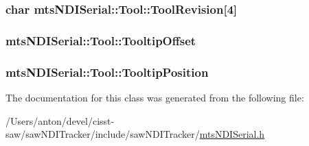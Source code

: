 \subsubsection[{Tool\+Revision}]{\setlength{\rightskip}{0pt plus 5cm}char mts\+N\+D\+I\+Serial\+::\+Tool\+::\+Tool\+Revision\mbox{[}4\mbox{]}}\label{classmts_n_d_i_serial_1_1_tool_aadd9c102dca4f53e5ea50188ddebc9e0}
\hypertarget{classmts_n_d_i_serial_1_1_tool_aa8acfe8b5a76a1fc7816233d6f853049}{}
\subsubsection[{Tooltip\+Offset}]{ mts\+N\+D\+I\+Serial\+::\+Tool\+::\+Tooltip\+Offset}\label{classmts_n_d_i_serial_1_1_tool_aa8acfe8b5a76a1fc7816233d6f853049}
\hypertarget{classmts_n_d_i_serial_1_1_tool_aef4e9c123a79afda4c764d27faeac338}{}
\subsubsection[{Tooltip\+Position}]{ mts\+N\+D\+I\+Serial\+::\+Tool\+::\+Tooltip\+Position}\label{classmts_n_d_i_serial_1_1_tool_aef4e9c123a79afda4c764d27faeac338}


The documentation for this class was generated from the following file\+:\begin{DoxyCompactItemize}
\item 
/\+Users/anton/devel/cisst-\/saw/saw\+N\+D\+I\+Tracker/include/saw\+N\+D\+I\+Tracker/\hyperlink{mts_n_d_i_serial_8h}{mts\+N\+D\+I\+Serial.\+h}\end{DoxyCompactItemize}
